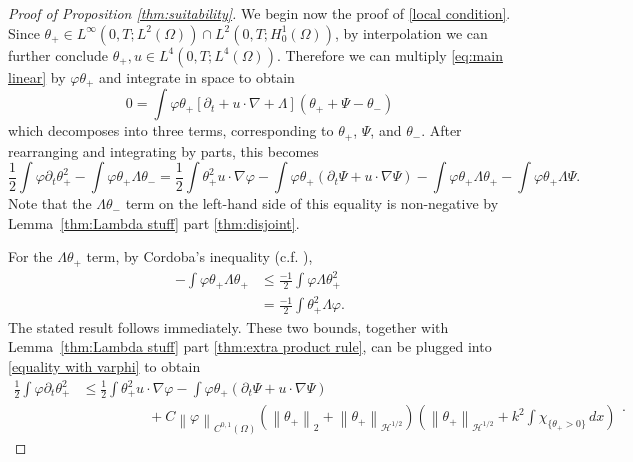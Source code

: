 \documentclass[11pt]{amsart}
\theoremstyle{remark}
\theoremstyle{definition}
\newcommand{\norm}[1]{\left\lVert#1\right\rVert}
\newcommand{\paren}[1]{\left( #1 \right)}
\newcommand{\bracket}[1]{\left[ #1 \right]}
\newcommand{\del}{\partial}
\newcommand{\grad}{\nabla}
\newcommand{\indic}[1]{\chi_{\{#1\}}}
\newcommand{\HD}{\mathcal{H}}
\begin{document}
\begin{proof}[Proof of Proposition \ref{thm:suitability}]
We begin now the proof of \eqref{local condition}.  Since $\theta_+ \in L^\infty(0,T; L^2(\Omega)) \cap L^2(0,T; H_0^1(\Omega))$, by interpolation we can further conclude $\theta_+,u \in L^4(0,T; L^4(\Omega))$.  Therefore we can multiply \eqref{eq:main linear} by $\varphi \theta_+$ and integrate in space to obtain
\[ 0 = \int \varphi \theta_+ \bracket{ \del_t + u \cdot \grad + \Lambda } \paren{\theta_+ + \Psi - \theta_-} \]
which decomposes into three terms, corresponding to $\theta_+$, $\Psi$, and $\theta_-$.  After rearranging and integrating by parts, this becomes
\begin{equation}\label{equality with varphi}
\frac{1}{2} \int \varphi \del_t \theta_+^2 - \int \varphi \theta_+ \Lambda \theta_- = \frac{1}{2} \int  \theta_+^2 u \cdot \grad \varphi - \int \varphi \theta_+ \paren{\del_t \Psi + u \cdot \grad \Psi} - \int \varphi \theta_+ \Lambda \theta_+ - \int \varphi \theta_+ \Lambda \Psi. 
\end{equation}
Note that the $\Lambda \theta_-$ term on the left-hand side of this equality is non-negative by Lemma~\ref{thm:Lambda stuff} part \eqref{thm:disjoint}.  

For the $\Lambda \theta_+$ term, by Cordoba's inequality (c.f. \cite{CoIg.fraclap}),
\begin{equation*} \begin{aligned}
-\int \varphi \theta_+ \Lambda \theta_+ &\leq \frac{-1}{2} \int \varphi \Lambda \theta_+^2
\\ &= \frac{-1}{2} \int \theta_+^2 \Lambda \varphi.
\end{aligned} \end{equation*}
The stated result follows immediately.  
These two bounds, together with Lemma~\ref{thm:Lambda stuff} part \eqref{thm:extra product rule}, can be plugged into \eqref{equality with varphi} to obtain
\[\begin{aligned} \frac{1}{2} \int \varphi \del_t \theta_+^2 &\leq \frac{1}{2} \int \theta_+^2 u\cdot\grad\varphi - \int \varphi \theta_+ \paren{\del_t \Psi + u\cdot\grad\Psi} 
\\ & \hspace{2cm}+ C \norm{\varphi}_{C^{0,1}(\Omega)} \paren{\norm{\theta_+}_2 + \norm{\theta_+}_{\HD^{1/2}}} \paren{\norm{\theta_+}_{\HD^{1/2}} + k^2 \int \indic{\theta_+>0} \,dx} \end{aligned}.\]


\end{proof}
\end{document}
